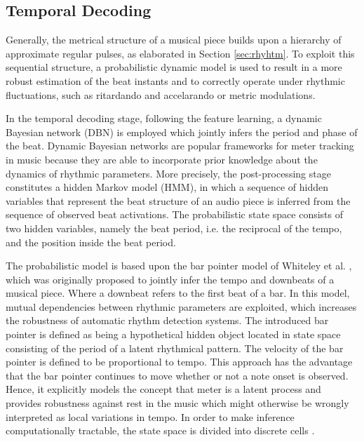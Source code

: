\documentclass{scrartcl}
\begin{document}


\subsection{Temporal Decoding}
\label{sec:temporal_decoding}

Generally, the metrical structure of a musical piece builds upon a hierarchy of approximate regular pulses, as elaborated in Section \ref{sec:rhyhtm}. To exploit this sequential structure, a probabilistic dynamic model is used to result in a more robust estimation of the beat instants and to correctly operate under rhythmic fluctuations, such as ritardando and accelarando or metric modulations.

In the temporal decoding stage, following the feature learning, a dynamic Bayesian network (DBN) is employed which jointly infers the period and phase of the beat. Dynamic Bayesian networks are popular frameworks for meter tracking in music because they are able to incorporate prior knowledge about the dynamics of rhythmic parameters. More precisely, the post-processing stage constitutes a hidden Markov model (HMM), in which a sequence of hidden variables that represent the beat structure of an audio piece is inferred from the sequence of observed beat activations. The probabilistic state space consists of two hidden variables, namely the beat period, i.e. the reciprocal of the tempo, and the position inside the beat period. 

The probabilistic model is based upon the bar pointer model of Whiteley et al. \cite{Whiteley2006}, which was originally proposed to jointly infer the tempo and  downbeats of a musical piece. Where a downbeat refers to the first beat of a bar. In this model, mutual dependencies between rhythmic parameters are exploited, which increases the robustness of automatic rhythm detection systems. The introduced bar pointer is defined as being a hypothetical hidden object located in state space consisting of the period of a latent rhythmical pattern. The velocity of the bar pointer is defined to be proportional to tempo. This approach has the advantage that the bar pointer continues to move whether or not a note onset is observed. Hence, it explicitly models the concept that meter is a latent process and provides robustness against rest in the music which might otherwise be wrongly interpreted as local variations in tempo. In order to make inference computationally tractable, the state space is divided into discrete cells \cite{Krebs2015}. 
\end{document}
